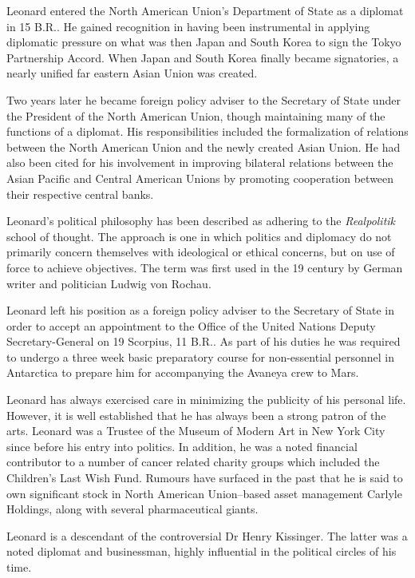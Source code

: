 Leonard entered the North American Union's Department of State as a diplomat in 15 B.R.. He gained recognition in having been instrumental in applying diplomatic pressure on what was then Japan and South Korea to sign the Tokyo Partnership Accord. When Japan and South Korea finally became signatories, a nearly unified far eastern Asian Union was created.

Two years later he became foreign policy adviser to the Secretary of State under the President of the North American Union, though maintaining many of the functions of a diplomat. His responsibilities included the formalization of relations between the North American Union and the newly created Asian Union. He had also been cited for his involvement in improving bilateral relations between the Asian Pacific and Central American Unions by promoting cooperation between their respective central banks. 

Leonard's political philosophy has been described as adhering to the {\it Realpolitik} school of thought. The approach is one in which politics and diplomacy do not primarily concern themselves with ideological or ethical concerns, but on use of force to achieve objectives. The term was first used in the 19 century by German writer and politician Ludwig von Rochau.

Leonard left his position as a foreign policy adviser to the Secretary of State in order to accept an appointment to the Office of the United Nations Deputy Secretary-General on 19 Scorpius, 11 B.R.. As part of his duties he was required to undergo a three week basic preparatory course for non-essential personnel in Antarctica to prepare him for accompanying the Avaneya crew to Mars.

Leonard has always exercised care in minimizing the publicity of his personal life. However, it is well established that he has always been a strong patron of the arts. Leonard was a Trustee of the Museum of Modern Art in New York City since before his entry into politics. In addition, he was a noted financial contributor to a number of cancer related charity groups which included the Children's Last Wish Fund. Rumours have surfaced in the past that he is said to own significant stock in North American Union--based asset management Carlyle Holdings, along with several pharmaceutical giants.

Leonard is a descendant of the controversial Dr Henry Kissinger. The latter was a noted diplomat and businessman, highly influential in the political circles of his time.

